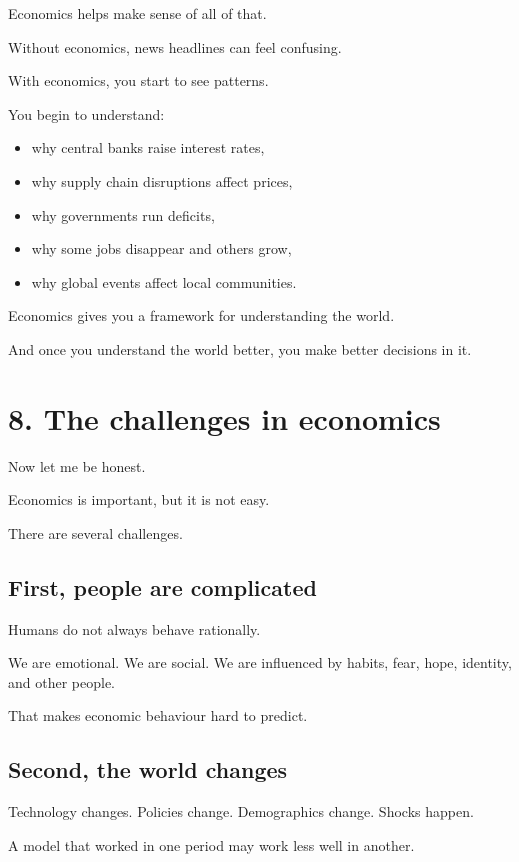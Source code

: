 \documentclass[12pt]{article}
\begin{document}
Economics helps make sense of all of that.

Without economics, news headlines can feel confusing.

With economics, you start to see patterns.

You begin to understand:
\begin{itemize}[leftmargin=2em]
    \item why central banks raise interest rates,
    \item why supply chain disruptions affect prices,
    \item why governments run deficits,
    \item why some jobs disappear and others grow,
    \item why global events affect local communities.
\end{itemize}

Economics gives you a framework for understanding the world.

And once you understand the world better, you make better decisions in it.

\section*{8. The challenges in economics}

Now let me be honest.

Economics is important, but it is not easy.

There are several challenges.

\subsection*{First, people are complicated}

Humans do not always behave rationally.

We are emotional.  
We are social.  
We are influenced by habits, fear, hope, identity, and other people.

That makes economic behaviour hard to predict.

\subsection*{Second, the world changes}

Technology changes.  
Policies change.  
Demographics change.  
Shocks happen.

A model that worked in one period may work less well in another.
\end{document}
